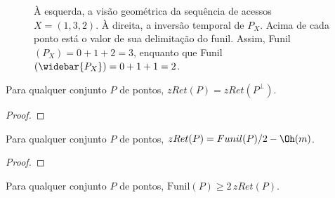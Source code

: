 \begin{figure}
    \caption{À esquerda, a visão geométrica da sequência de acessos $X = (1,3,2)$. À direita, a inversão temporal de $P_X$. Acima de cada ponto está o valor de sua delimitação do funil. Assim, Funil$(P_X) = 0 + 1 + 2 = 3$, enquanto que Funil$(\protect \widebar{P_X}) = 0 + 1 + 1 = 2$.}
\label{fig:espelhamento-de-funil-2}
\end{figure}

\begin{lemma}
    Para qualquer conjunto $P$ de pontos, $zRet(P) = zRet(P^{\perp})$.
\end{lemma}

\begin{proof}
\end{proof}

\begin{lemma}
    Para qualquer conjunto $P$ de pontos, $zRet(P) = Funil(P)/2 - \Oh(m)$.
\end{lemma}

\begin{proof}
\end{proof}

\begin{lemma}
    Para qualquer conjunto $P$ de pontos, $\text{Funil}(P) \geq 2 \, zRet(P)$.
\end{lemma}

